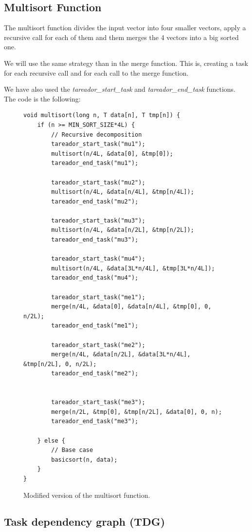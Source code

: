 \documentclass[12pt, a4paper]{article}
\begin{document}
\subsection{Multisort Function}

The multisort function divides the input vector into four smaller vectors, apply a recursive call for each of them and them merges the 4 vectors into a big sorted one.

We will use the same strategy than in the merge function. This is, creating a task for each recursive call and for each call to the merge function.

We have also used the \textit{tareador\_start\_task} and \textit{tareador\_end\_task} functions. The code is the following:

\begin{figure}[H]
\begin{lstlisting}
void multisort(long n, T data[n], T tmp[n]) {
    if (n >= MIN_SORT_SIZE*4L) {
        // Recursive decomposition
        tareador_start_task("mu1");
        multisort(n/4L, &data[0], &tmp[0]);
        tareador_end_task("mu1");

        tareador_start_task("mu2");
        multisort(n/4L, &data[n/4L], &tmp[n/4L]);
        tareador_end_task("mu2");

        tareador_start_task("mu3");
        multisort(n/4L, &data[n/2L], &tmp[n/2L]);
        tareador_end_task("mu3");

        tareador_start_task("mu4");
        multisort(n/4L, &data[3L*n/4L], &tmp[3L*n/4L]);
        tareador_end_task("mu4");

        tareador_start_task("me1");
        merge(n/4L, &data[0], &data[n/4L], &tmp[0], 0, n/2L);
        tareador_end_task("me1");

        tareador_start_task("me2");
        merge(n/4L, &data[n/2L], &data[3L*n/4L], &tmp[n/2L], 0, n/2L);
        tareador_end_task("me2");


        tareador_start_task("me3");
        merge(n/2L, &tmp[0], &tmp[n/2L], &data[0], 0, n);
        tareador_end_task("me3");

    } else {
        // Base case
        basicsort(n, data);
    }
}
\end{lstlisting}

\label{code:multisort_tareador}
\caption{Modified version of the multisort function.}
\end{figure}

\subsection{Task dependency graph (TDG)}
\label{subsec:TDG}
\end{document}

